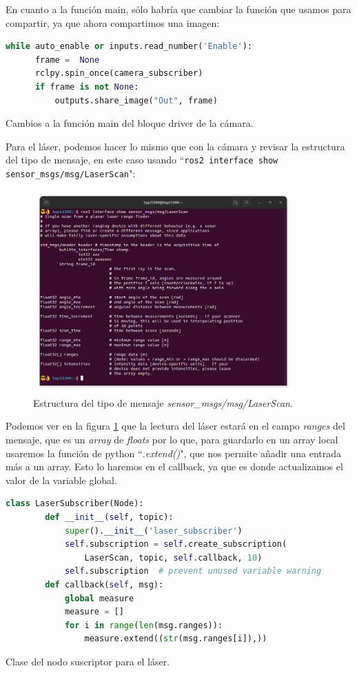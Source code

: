 En cuanto a la función main, sólo habría que cambiar la función que usamos para compartir, ya que ahora compartimos una imagen:
\begin{code}[H]
  \begin{lstlisting}[language=python]
  while auto_enable or inputs.read_number('Enable'):
      frame =  None
      rclpy.spin_once(camera_subscriber)
      if frame is not None:
          outputs.share_image("Out", frame)
  \end{lstlisting}
  \caption[Cambios main bloque cámara]{Cambios a la función main del bloque driver de la cámara.}
  \label{cod:cam_main_changes}
\end{code}
Para el láser, podemos hacer lo mismo que con la cámara y revisar la estructura del tipo de mensaje, en este caso usando ``\lstinline|ros2 interface show sensor_msgs/msg/LaserScan|":
\begin{figure} [H]
  \begin{center}
      \includegraphics[width=10cm]{figs/c4/laserscan_struct.png}
  \end{center}
  \caption[Estructura mensaje LaserScan]{Estructura del tipo de mensaje \textit{sensor\_msgs/msg/LaserScan}.}
  \label{fig:laserscan_struct}
\end{figure}
Podemos ver en la figura \ref{fig:laserscan_struct} que la lectura del láser estará en el campo \textit{ranges} del mensaje, que es un \textit{array}
de \textit{floats} por lo que, para guardarlo en un array local usaremos la función de python ``\textit{.extend()}", que nos permite añadir una entrada
más a un array. Esto lo haremos en el callback, ya que es donde actualizamos el valor de la variable global.
\begin{code}[H]
  \begin{lstlisting}[language=python]
    class LaserSubscriber(Node):
        def __init__(self, topic):
            super().__init__('laser_subscriber')
            self.subscription = self.create_subscription(
                LaserScan, topic, self.callback, 10)
            self.subscription  # prevent unused variable warning
        def callback(self, msg):
            global measure
            measure = []
            for i in range(len(msg.ranges)):
                measure.extend((str(msg.ranges[i]),))
  \end{lstlisting}
  \caption[Clase del nodo suscriptor para láser]{Clase del nodo suscriptor para el láser.}
  \label{cod:laser_node_class}
\end{code}
